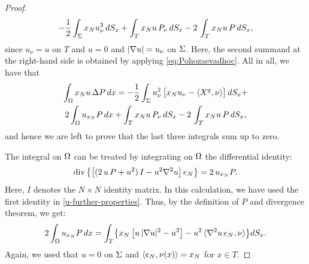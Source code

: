 \documentclass[a4paper,10pt]{amsart}
\numberwithin{equation}{section}
\begin{document}
\begin{proof}
\begin{multline*}
 -\frac12 \int_\Sigma x_N u^3_\nu\, dS_x
+\int_T x_N u \, P_\nu\,dS_x-2\,\int_T x_N u\, P \, dS_x,
\end{multline*}
since $u_\nu=u$ on $T$ and $u=0$ and $|\nabla u|=u_\nu$ on $\Sigma$. Here, the second summand at the right-hand side is obtained by applying \eqref{eq:Pohozaevadhoc}.
All in all, we have that
\begin{multline*}
\int_\Omega x_N u\, \Delta P \, dx =
-\frac12 \int_\Sigma u^2_\nu\, \bigl[x_N u_\nu-\langle X^q, \nu\rangle\bigr]\, dS_x+ \\
2 \int_\Omega u_{x_N}  P \, dx+\int_T x_N u \, P_\nu\,dS_x-2\,\int_T x_N u\, P \, dS_x,
\end{multline*}
and hence we are left to prove that the last three integrals sum up to zero.
\par
The integral on $\Omega$ can be treated by integrating on $\Omega$ the differential identity:
$$
\mathop{\mathrm{div}}\left\{ \left[ (2\,u\,P+u^2)\,I-u^2 \nabla^2u \right] e_N \right\}  =2\,u_{x_N} P.
$$
Here, $I$ denotes the $N\times N$ identity matrix.
In this calculation, we have used the first identity in \eqref{u-further-properties}. Thus, by the definition of $P$ and divergence theorem, we get:
\begin{equation}
\label{volume-integral}
2 \int_\Omega u_{x_N}  P \, dx=
\int_T \bigl\{x_N\,\bigl[u\,|\nabla u|^2-u^2\bigr] -u^2\,\langle\nabla^2 u\, e_N,\nu\rangle\bigr\} dS_x.
\end{equation}
Again, we used that $u=0$ on $\Sigma$ and $\langle e_N,\nu(x)\rangle=x_N$ for $x\in T$.
%


\end{proof}
\end{document}

